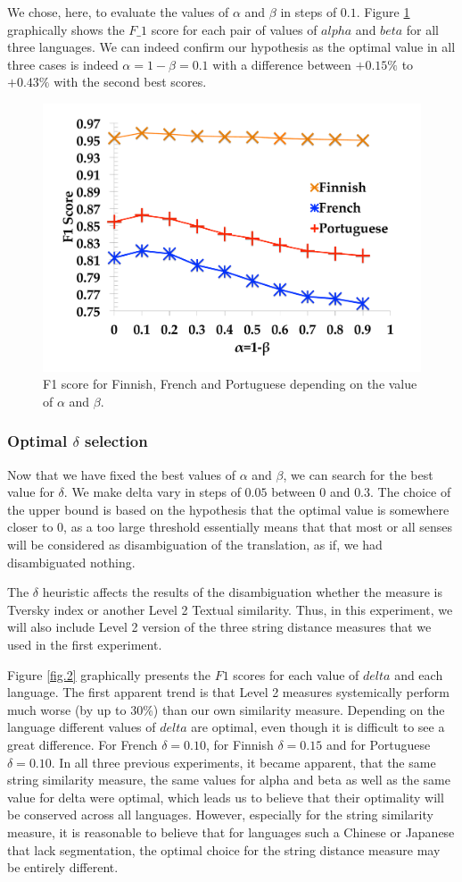 \documentclass[10pt, a4paper]{article}
\begin{document}
We chose, here, to evaluate the values of \(\alpha\) and \(\beta\) in steps of \(0.1\). Figure \ref{fig.1} graphically shows the \(F\_1\) score for each pair of values of \(alpha\) and \(beta\) for all three languages. We can indeed confirm our hypothesis as the optimal value in all three cases is indeed \(\alpha=1-\beta=0.1\) with a difference between \(+0.15\%\) to \(+0.43\%\) with the second best scores.
	
\begin{figure}\centering
\includegraphics[width=0.64\columnwidth]{alphabetafig}
\caption{F1 score for Finnish, French and Portuguese depending on the value of \(\alpha\) and \(\beta\).}
\label{fig.1}
\end{figure}

\subsubsection{Optimal \(\delta\) selection}
Now that we have fixed the best values of \(\alpha\) and \(\beta\), we can search for the best value for \(\delta\). We make delta vary in steps of \(0.05\) between \(0\) and \(0.3\). The choice of the upper bound is based on the hypothesis that the optimal value is somewhere closer to 0, as a too large threshold essentially means that that most or all senses will be considered as disambiguation of the translation, as if, we had disambiguated nothing. 

The \(\delta\) heuristic affects the results of the disambiguation whether the measure is  Tversky index or another Level 2 Textual similarity. Thus, in this experiment, we will also include Level 2 version of the three string distance measures that we used in the first experiment.

Figure \ref{fig.2} graphically presents the \(F1\) scores for each value of \(delta\) and each language. The first apparent trend is that Level 2 measures systemically perform much worse (by up to 30\%) than our own similarity measure. Depending on the language different values of \(delta\) are optimal, even though it is difficult to see a great difference. For French \(\delta=0.10\), for Finnish \(\delta=0.15\)
 and for Portuguese \(\delta=0.10\). 
In all three previous experiments, it became apparent, that the same string similarity measure, the same values for alpha and beta as well as the same value for delta were optimal, which leads us to believe that their optimality will be conserved across all languages. However, especially for the string similarity measure, it is reasonable to believe that for languages such a Chinese or Japanese that lack segmentation, the optimal choice for the string distance measure may be entirely different.
\end{document}

